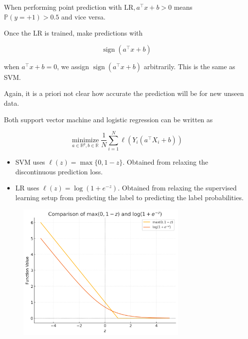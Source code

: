 \documentclass{report}
\begin{document}
\begin{concept}
    When performing point prediction with $\mathrm{LR}, a^{\top} x+b>0$ means $\mathbb{P}(y=+1)>0.5$ and vice versa.

    Once the LR is trained, make predictions with

    $$
    \operatorname{sign}\left(a^{\top} x+b\right)
    $$

    when $a^{\top} x+b=0$, we assign $\operatorname{sign}\left(a^{\top} x+b\right)$ arbitrarily. This is the same as SVM.

    Again, it is a priori not clear how accurate the prediction will be for new unseen data.
\end{concept}

\begin{concept}[3.15][SVM vs LR]
    Both support vector machine and logistic regression can be written as

    $$
    \underset{a \in \mathbb{R}^{p}, b \in \mathbb{R}}{\operatorname{minimize}} \frac{1}{N} \sum_{i=1}^{N} \ell\left(Y_{i}\left(a^{\top} X_{i}+b\right)\right)
    $$

    \begin{itemize}
        \item SVM uses $\ell(z)=\max \{0,1-z\}$. Obtained from relaxing the discontinuous prediction loss.
        \item LR uses $\ell(z)=\log \left(1+e^{-z}\right)$. Obtained from relaxing the supervised learning setup from predicting the label to predicting the label probabilities.
    \end{itemize}

    \begin{figure}[H]
        \centering
        \includegraphics[width=0.75\textwidth]{.././assets/3.2.png}
    \end{figure}


\end{concept}
\end{document}
